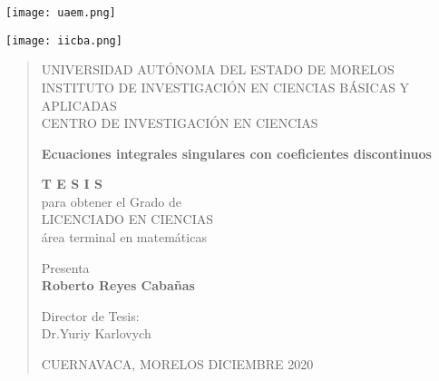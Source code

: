 \documentclass[11pt,letterpaper,openany]{book}
\begin{document}
\begin{titlepage}
	\begin{minipage}{0.2\textwidth}
		\begin{center} 
			\texttt{[image: uaem.png]}\\ %
		\end{center}
	\end{minipage}
	\hspace{7cm}
	\begin{minipage}{0.2\textwidth}
		\begin{center}
			\texttt{[image: iicba.png]}\\ %
		\end{center}
	\end{minipage}
\vspace{24pt}

\begin{quote}	
\begin{center}
 UNIVERSIDAD AUTÓNOMA DEL ESTADO DE MORELOS\\
INSTITUTO DE INVESTIGACIÓN EN CIENCIAS BÁSICAS Y APLICADAS\\
CENTRO DE INVESTIGACIÓN EN CIENCIAS
\end{center}
\vspace{24pt}
\begin{center}
\Large \textbf{Ecuaciones integrales singulares con coeficientes discontinuos}
\end{center}
\vspace{24pt}
\begin{center}
\Large \textbf{T E S I S}\\
\normalsize para obtener el Grado de\\
\Large LICENCIADO EN CIENCIAS\\
\normalsize área terminal en matemáticas
\end{center}
\vspace{24pt}
\begin{center}
Presenta\\
\Large \textbf{Roberto Reyes Cabañas}
\end{center}

\vspace{24pt}
\begin{center}
Director de Tesis:\\
\large Dr.Yuriy Karlovych
\end{center}

\vspace{24pt}
\begin{center}
\normalsize CUERNAVACA, MORELOS DICIEMBRE 2020
\end{center}

\end{quote}
	
\end{titlepage}
\end{document}
